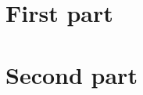 \documentclass[twoside,onecolumn,openright,10pt]{memoir}
\begin{document}

\ChapterOutsidePart 

\frontmatter


\mainmatter
\ChapterInsidePart
\part{First part}


\part{Second part}


\ChapterOutsidePart
\backmatter
\SingleSpacing



\end{document}
